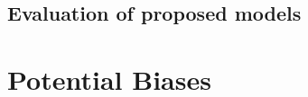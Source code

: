 \documentclass[journal]{IEEEtran}
\begin{document}
\subsection{Evaluation of proposed models}


\section{Potential Biases} \label{sec:bias}


%
%



%
%
\end{document}
